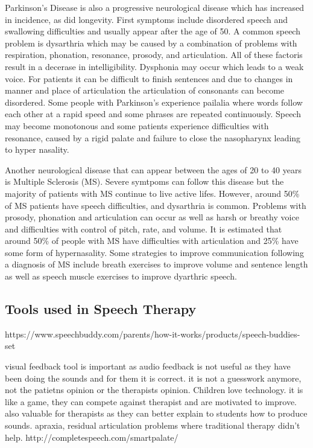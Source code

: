 Parkinson's Disease is also a progressive neurological disease which has increased in incidence, as did longevity. First symptoms include disordered speech and swallowing difficulties and usually appear after the age of 50. A common speech problem is dysarthria which may be caused by a combination of problems with respiration, phonation, resonance, prosody, and articulation. All of these factoris result in a decerase in intelligibility. Dysphonia may occur which leads to a weak voice. For patients it can be difficult to finish sentences and due to changes in manner and place of articulation the articulation of consonants can become disordered. Some people with Parkinson's experience pailalia where words follow each other at a rapid speed and some phrases are repeated continuously. Speech may become monotonous and some patients experience difficulties with resonance, caused by a rigid palate and failure to close the nasopharynx leading to hyper nasality.\cite{communicationDifficulties}

Another neurological disease that can appear between the ages of 20 to 40 years is Multiple Sclerosis (MS). Severe symtpoms can follow this disease but the majority of patients with MS continue to live active lifes. However, around 50\% of MS patients have speech difficulties, and dysarthria is common. 
Problems with prosody, phonation and articulation can occur as well as harsh or breathy voice and difficulties with control of pitch, rate, and volume. It is estimated that around 50\% of people with MS have difficulties with
articulation and 25\% have some form of hypernasality. Some strategies to improve communication following a diagnosis of MS include breath exercises to improve volume and sentence length as well as speech muscle exercises to improve dyarthric speech. \cite{communicationDifficulties}

\subsection{Tools used in Speech Therapy}

https://www.speechbuddy.com/parents/how-it-works/products/speech-buddies-set

visual feedback tool is important as audio feedback is not useful as they have been doing the sounds and for them it is correct. it is not a guesswork anymore, not the patietns opinion or the therapists opinion. Children love technology. it is like a game, they can compete against therapist and are motivated to improve. also valuable for therapists as they can better explain to students how to produce sounds. apraxia, residual articulation problems where traditional therapy didn't help. 
http://completespeech.com/smartpalate/

